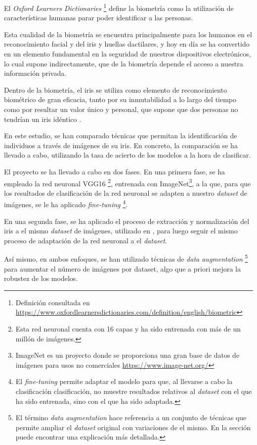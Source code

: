  \label{capitulo1}

El \textit{Oxford Learners Dictionaries} \footnote{Definición consultada en \url{https://www.oxfordlearnersdictionaries.com/definition/english/biometric}} define la biometría como la utilización de características humanas parar poder identificar a las personas.

Esta cualidad de la biometría se encuentra principalmente para los humanos en el reconocimiento facial y del iris y huellas dactilares, y hoy en día
se ha convertido en un elemento fundamental en la seguridad de nuestros dispositivos electrónicos, lo cual supone indirectamente,
que de la biometría depende el acceso a nuestra información privada.

Dentro de la biometría, el iris se utiliza como elemento de reconocimiento biométrico de gran eficacia, tanto por su inmutabilidad a lo largo del tiempo como por resultar un valor único y 
personal, que supone que dos personas no tendrían un iris idéntico \cite{malgheet_iris_2021}. 

En este estudio, se han comparado técnicas que permitan la identificación de individuos a través de imágenes de su iris. 
En concreto, la comparación se ha llevado a cabo, utilizando la tasa de acierto de los modelos a la hora de clasificar. 

El proyecto se ha llevado a cabo en dos fases. En una primera fase, se ha empleado la red neuronal VGG16 \footnote{Esta red neuronal cuenta con 16 capas y ha sido entrenada con más de un millón de imágenes.}, entrenada con ImageNet\footnote{ImageNet es un proyecto donde se proporciona 
una gran base de datos de imágenes para usos no comerciales \url{https://www.image-net.org/}}, a la que, para que los resultados de clasificación de la red neuronal se adapten a nuestro \textit{dataset} de imágenes, se le ha aplicado \textit{fine-tuning} \footnote{El \textit{fine-tuning} 
permite adaptar el modelo para que, al llevarse a cabo la clasificación clasificación, no muestre resultados relativos al \textit{dataset} con el que ha sido entrenada, sino con el que ha sido adaptada.}.

En una segunda fase, se ha aplicado el proceso de extracción y normalización del iris a el mismo \textit{dataset} de imágenes, utilizado en \cite{tfg_iris_2020}, para luego seguir el mismo proceso de adaptación de la red neuronal
a el \textit{dataset}.

Así mismo, en ambos enfoques, se han utilizado técnicas de \textit{data augmentation} \footnote{El término \textit{data augmentation} hace referencia a un conjunto de técnicas que permite ampliar el \textit{dataset} original con variaciones de el mismo. En la sección  puede encontrar una explicación más detallada.} para aumentar el número de imágenes por dataset, algo que a priori mejora la robustez de los modelos.

